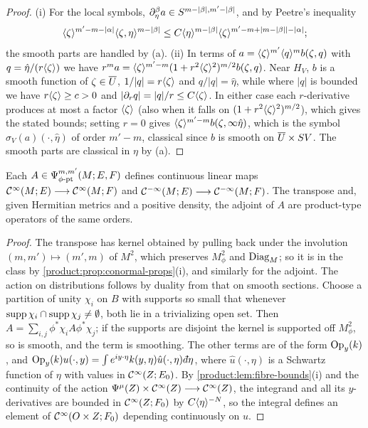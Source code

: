 \begin{proof}
(i) For the local symbols, $\partial_\eta^\beta a\in S^{m-|\beta|,m'-|\beta|}$, and by
Peetre's inequality
\begin{equation*}
\langle \zeta\rangle^{m'-m-|\alpha|}\langle \zeta,\eta\rangle^{m-|\beta|}\le C\langle \eta\rangle^{m-|\beta|}
\langle \zeta\rangle^{m'-m+|m-|\beta||-|\alpha|};
\end{equation*} the smooth parts are handled by (a). (ii) In
terms of $a=\langle \zeta\rangle^{m'}\langle q\rangle^mb(\zeta,q)$ with $q=\hat\eta/(r\langle \zeta\rangle)$ we have
$r^ma=\langle \zeta\rangle^{m'-m}(1+r^2\langle \zeta\rangle^2)^{m/2}b(\zeta,q)$. Near $H_V$, $b$ is a
smooth function of $\zeta\in\overline{U}$, $1/|q|=r\langle \zeta\rangle$ and $q/|q|=\hat\eta$, while
where $|q|$ is bounded we have $r\langle \zeta\rangle\ge c>0$ and
$|\partial_rq|=|q|/r\le C\langle \zeta\rangle$. In either case each $r$-derivative produces at
most a factor $\langle \zeta\rangle$ (also when it falls on $(1+r^2\langle \zeta\rangle^2)^{m/2}$), which
gives the stated bounds; setting $r=0$ gives $\langle \zeta\rangle^{m'-m}b(\zeta,\infty\hat\eta)$,
which is the symbol $\sigma_V(a)(\cdot,\hat\eta)$ of order $m'-m$, classical since
$b$ is smooth on $\overline{U}\times SV$. The smooth parts are classical in $\eta$ by
(a).
\end{proof}

\begin{proposition}\label{product:prop:mapping}
Each $A\in\Psi^{m,m'}_{\phi\text{-}\mathrm{pt}}(M;E,F)$ defines continuous linear maps
$\mathcal{C}^\infty(M;E)\longrightarrow\mathcal{C}^\infty(M;F)$ and $\mathcal{C}^{-\infty}(M;E)\longrightarrow\mathcal{C}^{-\infty}(M;F)$. The
transpose and, given Hermitian metrics and a positive density, the adjoint of
$A$ are product-type operators of the same orders.
\end{proposition}

\begin{proof}
The transpose has kernel obtained by pulling back under the involution
$(m,m')\mapsto(m',m)$ of $M^2$, which preserves $M^2_\phi$ and $\operatorname{Diag}_M$; so it is
in the class by \cref{product:prop:conormal-props}(i), and similarly for the
adjoint. The action on distributions follows by duality from that on smooth
sections. Choose a partition of unity $\chi_i$ on $B$ with supports so small that
whenever $\operatorname{supp}\chi_i\cap\operatorname{supp}\chi_j\ne\emptyset$, both lie in a trivializing open
set. Then $A=\sum_{i,j}\phi^*\chi_iA\phi^*\chi_j$; if the supports are disjoint the
kernel is supported off $M^2_\phi$, so is smooth, and the term is smoothing. The
other terms are of the form $\operatorname{Op}_y(k)$, and
$\Op_y(k)u(\cdot,y)=\int e^{iy\cdot\eta}k(y,\eta)\hat u(\cdot,\eta)\,\dbar\eta$,
where $\hat u(\cdot,\eta)$ is a Schwartz function of $\eta$ with values in
$\mathcal{C}^\infty(Z;E_0)$. By \cref{product:lem:fibre-bounds}(i) and the continuity of the
action $\Psi^{\mu}(Z)\times\mathcal{C}^\infty(Z)\longrightarrow\mathcal{C}^\infty(Z)$, the integrand and all its
$y$-derivatives are bounded in $\mathcal{C}^\infty(Z;F_0)$ by $C\langle \eta\rangle^{-N}$, so the integral
defines an element of $\mathcal{C}^\infty(O\times Z;F_0)$ depending continuously on $u$.
\end{proof}

